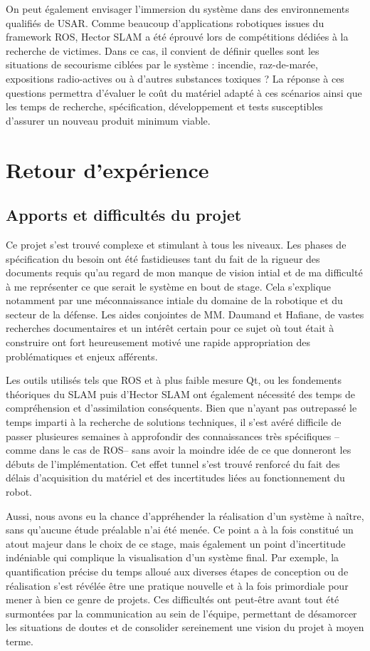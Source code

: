   On peut également envisager l'immersion du système dans des environnements qualifiés de \gls{USAR}.  
  Comme beaucoup d'applications robotiques issues du framework ROS, \gls{Hector SLAM} a été éprouvé lors de compétitions dédiées à la recherche de victimes. 
  Dans ce cas, il convient de définir quelles sont les situations de secourisme ciblées par le système : incendie, raz-de-marée, expositions radio-actives ou à d'autres substances toxiques ? 
  La réponse à ces questions permettra d'évaluer le coût du matériel adapté à ces scénarios ainsi que les temps de recherche, spécification, développement et tests susceptibles d'assurer un nouveau produit minimum viable. 
  
\section{Retour d'expérience}
  \subsection{Apports et difficultés du projet}
  
  Ce projet s'est trouvé complexe et stimulant à tous les niveaux. 
  Les phases de spécification du besoin ont été fastidieuses tant du fait de la rigueur des documents requis qu'au regard de mon manque de vision intial et de ma difficulté à me représenter ce que serait le système en bout de stage. 
  Cela s'explique notamment par une méconnaissance intiale du domaine de la robotique et du secteur de la défense.
  Les aides conjointes de MM. Daumand et Hafiane, de vastes recherches documentaires et un intérêt certain pour ce sujet où tout était à construire ont fort heureusement motivé une rapide appropriation des problématiques et enjeux afférents. 
  
  Les outils utilisés tels que ROS et à plus faible mesure Qt, ou les fondements théoriques du SLAM puis d'Hector SLAM ont également nécessité des temps de compréhension et d'assimilation conséquents. 
  Bien que n'ayant pas outrepassé le temps imparti à la recherche de solutions techniques, il s'est avéré difficile de passer plusieures semaines à approfondir des connaissances très spécifiques --comme dans le cas de ROS-- sans 
  avoir la moindre idée de ce que donneront les débuts de l'implémentation. 
  Cet effet tunnel s'est trouvé renforcé du fait des délais d'acquisition du matériel et des incertitudes liées au fonctionnement du robot. 
  
  Aussi, nous avons eu la chance d'appréhender la réalisation d'un système à naître, sans qu'aucune étude préalable n'ai été menée. 
  Ce point a à la fois constitué un atout majeur dans le choix de ce stage, mais également un point d'incertitude indéniable qui complique la visualisation d'un système final. 
  Par exemple, la quantification précise du temps alloué aux diverses étapes de conception ou de réalisation s'est révélée être une pratique nouvelle et à la fois primordiale pour mener à bien ce genre de projets. 
  Ces difficultés ont peut-être avant tout été surmontées par la communication au sein de l'équipe, permettant de désamorcer les situations de doutes et de consolider sereinement une vision du projet à moyen terme. 
  

